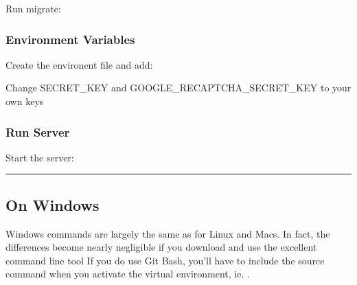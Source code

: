 \documentclass[letterpaper,10pt,english]{sphinxmanual}
\begin{document}
Run migrate: 


\subsubsection{Environment Variables}
\label{\detokenize{guide/01_quickstart:environment-variables}}
Create the environent file  and add:

\begin{sphinxVerbatim}[commandchars=\\\{\}]
 
\end{sphinxVerbatim}

Change SECRET\_KEY and GOOGLE\_RECAPTCHA\_SECRET\_KEY to your own keys


\subsubsection{Run Server}
\label{\detokenize{guide/01_quickstart:run-server}}
Start the server: 


\bigskip\hrule\bigskip



\subsection{On Windows}
\label{\detokenize{guide/01_quickstart:on-windows}}
Windows commands are largely the same as for Linux and Macs.
In fact, the differences become nearly negligible if you download and use the excellent command line tool 
If you do use Git Bash, you’ll have to include the source command when you activate the virtual environment, ie. .
\end{document}
